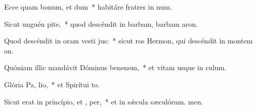 \item Ecce quam bonum, et  dum~* habitáre fratres in num.
\item Sicut unguén  pite,~* quod descéndit in barbam, barbam aron.
\item Quod descéndit in oram vesti jus:~* sicut ros Hermon, qui descéndit in montem on.
\item Quóniam illic mandávit Dóminus benenem,~* et vitam usque in culum.
\item Glória Pa,  lio,~* et Spirítui to.
\item Sicut erat in princípio, et ,  per,~* et in sǽcula sæculórum. men.
